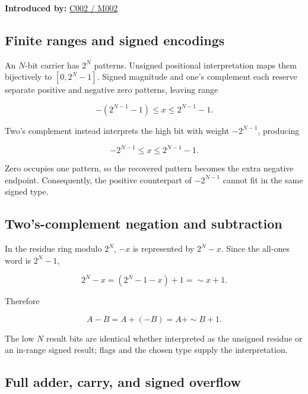 \hypertarget{01-foundations-i-ch011-m002---signed-representations-adders-and-arithmetic-policies}{}

\textbf{Introduced by:} \hyperref[01-foundations-i-ch001-arithmetic-becomes-a-policy]{C002 / M002}

\subsection{Finite ranges and signed encodings}\label{01-foundations-i-ch011-finite-ranges-and-signed-encodings}

\hypertarget{01-foundations-i-ch011-finite-ranges-and-signed-encodings}{}

An \(N\)-bit carrier has \(2^N\) patterns. Unsigned positional interpretation maps them bijectively to \([0,2^N-1]\). Signed magnitude and one's complement each reserve separate positive and negative zero patterns, leaving range

\[
-(2^{N-1}-1)\le x\le2^{N-1}-1.
\]

Two's complement instead interprets the high bit with weight \(-2^{N-1}\), producing

\[
-2^{N-1}\le x\le2^{N-1}-1.
\]

Zero occupies one pattern, so the recovered pattern becomes the extra negative endpoint. Consequently, the positive counterpart of \(-2^{N-1}\) cannot fit in the same signed type.

\subsection{Two's-complement negation and subtraction}\label{01-foundations-i-ch011-twos-complement-negation-and-subtraction}

\hypertarget{01-foundations-i-ch011-twos-complement-negation-and-subtraction}{}

In the residue ring modulo \(2^N\), \(-x\) is represented by \(2^N-x\). Since the all-ones word is \(2^N-1\),

\[
2^N-x=(2^N-1-x)+1=\sim x+1.
\]

Therefore

\[
A-B=A+(-B)=A+\sim B+1.
\]

The low \(N\) result bits are identical whether interpreted as the unsigned residue or an in-range signed result; flags and the chosen type supply the interpretation.

\subsection{Full adder, carry, and signed overflow}\label{01-foundations-i-ch011-full-adder-carry-and-signed-overflow}

